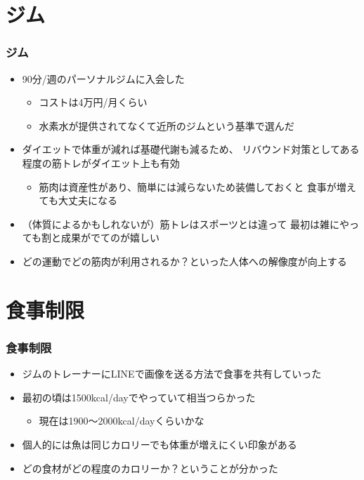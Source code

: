 \section{ジム}

\begin{frame}
  \frametitle{ジム}

  \begin{itemize}
    \pause
    \item<+-> 90分/週のパーソナルジムに入会した
    \begin{itemize}
      \item コストは4万円/月くらい
      \item 水素水が提供されてなくて近所のジムという基準で選んだ
    \end{itemize}

    \item<+-> ダイエットで体重が減れば基礎代謝も減るため、
    リバウンド対策としてある程度の筋トレがダイエット上も有効
    \begin{itemize}
      \item 筋肉は資産性があり、簡単には減らないため装備しておくと
      食事が増えても大丈夫になる
    \end{itemize}

    \item<+-> （体質によるかもしれないが）筋トレはスポーツとは違って
    最初は雑にやっても割と成果がでてのが嬉しい

    \item<+-> どの運動でどの筋肉が利用されるか？といった人体への解像度が向上する
  \end{itemize}
\end{frame}

\section{食事制限}

\begin{frame}
  \frametitle{食事制限}

  \begin{itemize}
    \pause
    \item<+-> ジムのトレーナーにLINEで画像を送る方法で食事を共有していった

    \item<+-> 最初の頃は1500kcal/dayでやっていて相当つらかった
    \begin{itemize}
      \item 現在は1900〜2000kcal/dayくらいかな
    \end{itemize}

    \item<+-> 個人的には魚は同じカロリーでも体重が増えにくい印象がある

    \item<+-> どの食材がどの程度のカロリーか？ということが分かった
  \end{itemize}
\end{frame}

